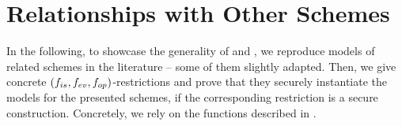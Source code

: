 \section{Relationships with Other Schemes}
\label{sec:relationships}


In the following, to showcase the generality of \UAS and \CUASGen, we reproduce
models of related schemes in the literature -- some of them slightly adapted.
Then, we give concrete $(f_{is},f_{ev},f_{op})$-\CUASGen restrictions and prove
that they securely instantiate the models for the presented schemes, if the
corresponding \CUASGen restriction is a secure \UAS construction. Concretely,
we rely on the functions described in .

\begin{figure}[ht!]

  \vspace*{1em}
  

\end{figure}
